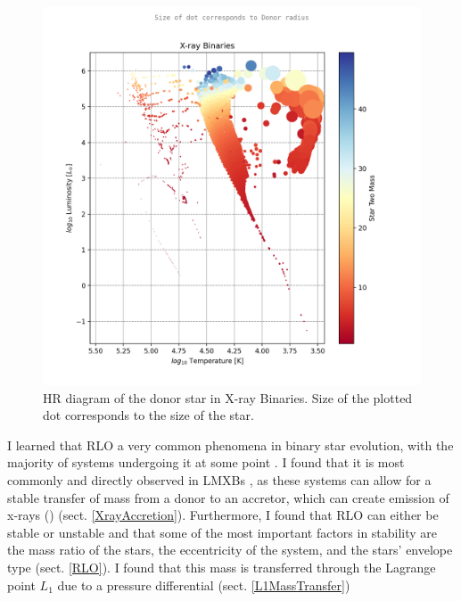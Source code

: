 \documentclass[12pt, a4paper]{article}
\begin{document}


        \begin{figure}[H]
            \centering
            \includegraphics[scale = .6]{figs/GeneratedFigs/ X-ray Binaries Star Two Mass log10 F star radius T.png}
            \caption{HR diagram of the donor star in X-ray Binaries. Size of the plotted dot corresponds to the size of the star.}
            \label{XrayBinaryHRDiagram}
        \end{figure}
        I learned that RLO a very common phenomena in binary star evolution, with the majority of systems undergoing it at some point \cite{TaurisvandenHeuvel+2023}. I found that it is most commonly and directly observed in LMXBs \cite{TaurisvandenHeuvel+2023}, as these systems can allow for a stable transfer of mass from a donor to an accretor, which can create emission of x-rays (\cite{TaurisvandenHeuvel+2023}) (sect. \ref{XrayAccretion}). Furthermore, I found that RLO can either be stable or unstable and that some of the most important factors in stability are the mass ratio of the stars, the eccentricity of the system, and the stars' envelope type (sect. \ref{RLO}). I found that this mass is transferred through the Lagrange point $L_1$ due to a pressure differential \parencite{TaurisvandenHeuvel+2023} (sect. \ref{L1MassTransfer}) 
\end{document}
